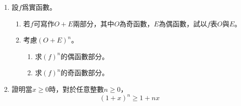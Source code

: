 \documentclass[12pt]{article}
\begin{document}
    \begin{enumerate}
        \item 設$f$爲實函數。\begin{enumerate}
            \item 若$f$可寫作$O+E$兩部分，其中$O$為奇函數，$E$為偶函數，試以$f$表$O$與$E$。
            \item 考慮$(O+E)^n$。\begin{enumerate}
                \item 求$(f)^n$的偶函數部分。
                \item 求$(f)^n$的奇函數部分。
            \end{enumerate}
        \end{enumerate}

        \item 證明當$x\geq 0$時，對於任意整數$n\geq 0$，$$(1+x)^n\geq 1+nx$$
    \end{enumerate}
\end{document}
